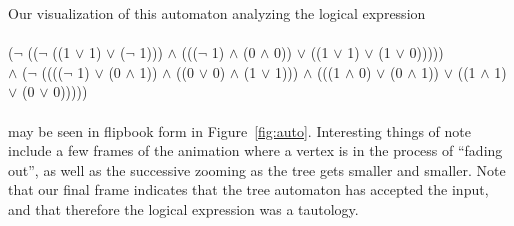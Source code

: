 \documentclass{article}
\begin{document}
Our visualization of this automaton analyzing the logical expression \\
~\\
($\lnot$ (($\lnot$ ((1 $\lor$ 1) $\lor$ ($\lnot$ 1))) $\land$ ((($\lnot$ 1) $\land$ (0 $\land$ 0)) $\lor$ ((1 $\lor$ 1) $\lor$ (1 $\lor$ 0))))) \\
$\land$ ($\lnot$ (((($\lnot$ 1) $\lor$ (0 $\land$ 1)) $\land$ ((0 $\lor$ 0) $\land$ (1 $\lor$ 1))) $\land$ (((1 $\land$ 0) $\lor$ (0 $\land$ 1)) $\lor$ ((1 $\land$ 1) $\lor$ (0 $\lor$ 0)))))\\
~\\
may be seen in flipbook form in Figure~\ref{fig:auto}.  Interesting things of note include a few frames of the animation where a vertex is in the process of ``fading out'', as well as the successive zooming as the tree gets smaller and smaller.  Note that our final frame indicates that the tree automaton has accepted the input, and that therefore the logical expression was a tautology.
\end{document}
